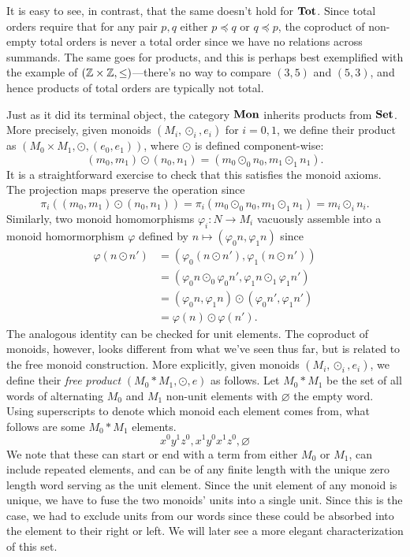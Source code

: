 It is easy to see, in contrast, that the same doesn't hold for $\mathbf{Tot}$. Since total orders require that for any pair $p,q$ either $p\preceq q$ or $q\preceq p$, the coproduct of non-empty total orders is never a total order since we have no relations across summands. The same goes for products, and this is perhaps best exemplified with the example of $(\mathbb Z\times\mathbb Z,\leq)$---there's no way to compare $(3,5)$ and $(5,3)$, and hence products of total orders are typically not total.

Just as it did its terminal object, the category $\mathbf{Mon}$ inherits products from $\mathbf{Set}$. More precisely, given monoids $(M_i,\odot_i,e_i)$ for $i=0,1$, we define their product as $(M_0\times M_1,\odot,(e_0,e_1))$, where $\odot$ is defined component-wise:
\[(m_0,m_1)\odot(n_0,n_1)=(m_0\odot_0 n_0,m_1\odot_1 n_1).\]
It is a straightforward exercise to check that this satisfies the monoid axioms. The projection maps preserve the operation since
\[\pi_i((m_0,m_1)\odot(n_0,n_1))=\pi_i(m_0\odot_0 n_0,m_1\odot_1 n_1) = m_i\odot_i n_i.\]
Similarly, two monoid homomorphisms $\varphi_i:N\to M_i$ vacuously assemble into a monoid homormorphism $\varphi$ defined by $n\mapsto (\varphi_0 n,\varphi_1 n)$ since 
\begin{align*}
    \varphi(n\odot n') &= (\varphi_0(n\odot n'),\varphi_1(n\odot n')) \\
    &= (\varphi_0n\odot_0\varphi_0 n', \varphi_1n\odot_1\varphi_1 n') \\
    &= (\varphi_0 n,\varphi_1 n)\odot (\varphi_0 n',\varphi_1 n') \\
    &= \varphi(n)\odot \varphi(n').
\end{align*}
The analogous identity can be checked for unit elements. The coproduct of monoids, however, looks different from what we've seen thus far, but is related to the free monoid construction. More explicitly, given monoids $(M_i,\odot_i,e_i)$, we define their \emph{free product} $(M_0*M_1,\odot,e)$ as follows. Let $M_0*M_1$ be the set of all words of alternating $M_0$ and $M_1$ non-unit elements with $\varnothing$ the empty word. Using superscripts to denote which monoid each element comes from, what follows are some $M_0*M_1$ elements.
\[x^0y^1z^0, x^1y^0x^1z^0, \varnothing\]
We note that these can start or end with a term from either $M_0$ or $M_1$, can include repeated elements, and can be of any finite length with the unique zero length word serving as the unit element. Since the unit element of any monoid is unique, we have to fuse the two monoids' units into a single unit. Since this is the case, we had to exclude units from our words since these could be absorbed into the element to their right or left. We will later see a more elegant characterization of this set.

